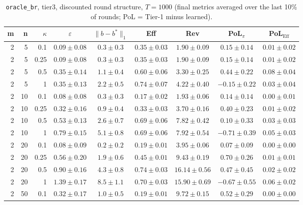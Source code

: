 \begin{table}[htbp]
\centering
\scriptsize
\caption{\texttt{oracle\_br}, tier3, discounted round structure, $T=1000$ (final metrics averaged over the last 10\% of rounds; PoL = Tier-1 minus learned).}
\label{tab:tier3_oracle_br_discounted}
\begin{tabular}{@{}rrrcccccc@{}}
\toprule
m & n & $\kappa$ & $\varepsilon$ & $\|b-b^*\|_1$ & Eff & Rev & PoL$_\pi$ & PoL$_\mathrm{Eff}$ \\
\midrule
2 & 5 & 0.1 & $0.09 \pm 0.08$ & $0.3 \pm 0.3$ & $0.35 \pm 0.03$ & $1.90 \pm 0.09$ & $0.15 \pm 0.14$ & $0.01 \pm 0.02$ \\
2 & 5 & 0.25 & $0.09 \pm 0.08$ & $0.3 \pm 0.3$ & $0.35 \pm 0.03$ & $1.90 \pm 0.09$ & $0.15 \pm 0.14$ & $0.01 \pm 0.02$ \\
2 & 5 & 0.5 & $0.35 \pm 0.14$ & $1.1 \pm 0.4$ & $0.60 \pm 0.06$ & $3.30 \pm 0.25$ & $0.44 \pm 0.22$ & $0.08 \pm 0.04$ \\
2 & 5 & 1 & $0.35 \pm 0.13$ & $2.2 \pm 0.5$ & $0.74 \pm 0.07$ & $4.22 \pm 0.40$ & $-0.15 \pm 0.22$ & $0.03 \pm 0.04$ \\
2 & 10 & 0.1 & $0.08 \pm 0.08$ & $0.3 \pm 0.3$ & $0.17 \pm 0.02$ & $1.93 \pm 0.06$ & $0.14 \pm 0.14$ & $0.00 \pm 0.01$ \\
2 & 10 & 0.25 & $0.32 \pm 0.16$ & $0.9 \pm 0.4$ & $0.33 \pm 0.03$ & $3.70 \pm 0.16$ & $0.40 \pm 0.23$ & $0.01 \pm 0.02$ \\
2 & 10 & 0.5 & $0.53 \pm 0.13$ & $2.6 \pm 0.7$ & $0.69 \pm 0.06$ & $7.82 \pm 0.42$ & $0.10 \pm 0.33$ & $0.03 \pm 0.03$ \\
2 & 10 & 1 & $0.79 \pm 0.15$ & $5.1 \pm 0.8$ & $0.69 \pm 0.06$ & $7.92 \pm 0.54$ & $-0.71 \pm 0.39$ & $0.05 \pm 0.03$ \\
2 & 20 & 0.1 & $0.08 \pm 0.09$ & $0.2 \pm 0.2$ & $0.19 \pm 0.01$ & $3.95 \pm 0.06$ & $0.07 \pm 0.09$ & $0.00 \pm 0.00$ \\
2 & 20 & 0.25 & $0.56 \pm 0.20$ & $1.9 \pm 0.6$ & $0.45 \pm 0.01$ & $9.43 \pm 0.19$ & $0.70 \pm 0.26$ & $0.01 \pm 0.01$ \\
2 & 20 & 0.5 & $0.90 \pm 0.16$ & $4.3 \pm 0.8$ & $0.74 \pm 0.03$ & $16.14 \pm 0.56$ & $0.47 \pm 0.45$ & $0.02 \pm 0.02$ \\
2 & 20 & 1 & $1.39 \pm 0.17$ & $8.5 \pm 1.1$ & $0.70 \pm 0.03$ & $15.90 \pm 0.69$ & $-0.67 \pm 0.55$ & $0.06 \pm 0.02$ \\
2 & 50 & 0.1 & $0.32 \pm 0.17$ & $1.0 \pm 0.5$ & $0.19 \pm 0.01$ & $9.72 \pm 0.15$ & $0.52 \pm 0.29$ & $0.00 \pm 0.00$ \\

\end{tabular}
\end{table}

